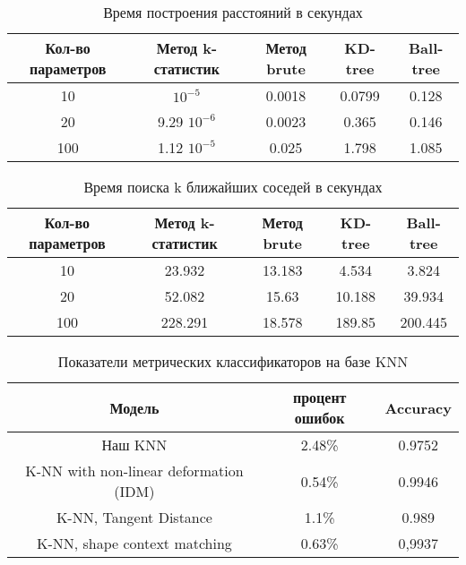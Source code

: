 \documentclass{article}
\begin{document}
\clearpage
\begin{table}[t]
    \caption{\label{table:times_for_algorithms_fit} Время построения расстояний в секундах}
    \begin{center}
        \begin{tabular}{|c|c|c|c|c|}
            \hline
            Кол-во параметров & Метод k-статистик & Метод brute & KD-tree & Ball-tree\\
            \hline
            10 & $10^{-5}$ & 0.0018 & 0.0799 & 0.128 \\
            \hline
            20 & 9.29 $10^{-6}$ &  0.0023 & 0.365 & 0.146 \\
            \hline
            100 & 1.12 $10^{-5}$ & 0.025 & 1.798 & 1.085\\
            \hline
        \end{tabular}
    \end{center}
\end{table} 
\begin{table}[t]
    \caption{\label{table:times_for_algorithms_predict} Время поиска k ближайших соседей в секундах}
    \begin{center}
        \begin{tabular}{|c|c|c|c|c|}
            \hline
            Кол-во параметров & Метод k-статистик & Метод brute & KD-tree & Ball-tree\\
            \hline
            10 & 23.932 & 13.183 & 4.534 & 3.824 \\
            \hline
            20 & 52.082 &  15.63 & 10.188 & 39.934 \\
            \hline
            100 & 228.291 & 18.578 & 189.85 & 200.445\\
            \hline
        \end{tabular}
    \end{center}
\end{table}             
\begin{table}[t]
    \caption{\label{table:best_KNNs} Показатели метрических классификаторов на базе KNN}
    \begin{center}
        \begin{tabular}{|c|c|c|}
            \hline
            Модель & процент ошибок & Accuracy \\
            \hline 
            Наш KNN & 2.48\% & 0.9752 \\
            \hline
            K-NN with non-linear deformation (IDM) & 0.54\% & 0.9946 \\
            \hline
            K-NN, Tangent Distance & 1.1\% & 0.989 \\
            \hline
            K-NN, shape context matching & 0.63\% & 0,9937 \\
            \hline
        \end{tabular}
    \end{center}
\end{table} 
\end{document}
